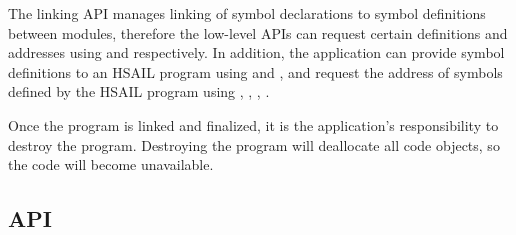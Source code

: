 \documentclass[final,oneside]{book}
\begin{document}
The linking API manages linking of symbol declarations to symbol definitions
between modules, therefore the low-level APIs can request certain definitions
and addresses using  and
 respectively. In addition, the
application can provide symbol definitions to an HSAIL program using
 and
, and request the address of
symbols defined by the HSAIL program using
,
,
,
.

Once the program is linked and finalized, it is the application's responsibility
to destroy the program. Destroying the program will deallocate all code objects,
so the code will become unavailable.

\subsection{API}



% 

% 

% 

% 
\end{document}
